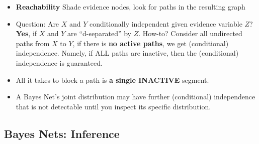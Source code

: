 \documentclass[twocolumn]{article}
\begin{document}
\begin{itemize}
\item \textbf{Reachability} Shade evidence nodes, look for paths in
  the resulting graph
\item Question: Are $X$ and $Y$ conditionally independent given
  evidence variable $Z$? \textbf{Yes}, if $X$ and $Y$ are
  ``d-separated'' by $Z$. How-to? Consider all undirected paths from
  $X$ to $Y$, if there is \textbf{no active paths}, we get (conditional)
  independence. Namely, if ALL paths are inactive, then the
  (conditional) independence is guaranteed.
\item All it takes to block a path is \textbf{a single INACTIVE}
  segment.
\item A Bayes Net's joint distribution may have further (conditional)
  independence that is not detectable until you inspect its specific
  distribution. 
\end{itemize}


\subsection{Bayes Nets: Inference}
\label{sec:bayes-nets:-infer}
\end{document}
